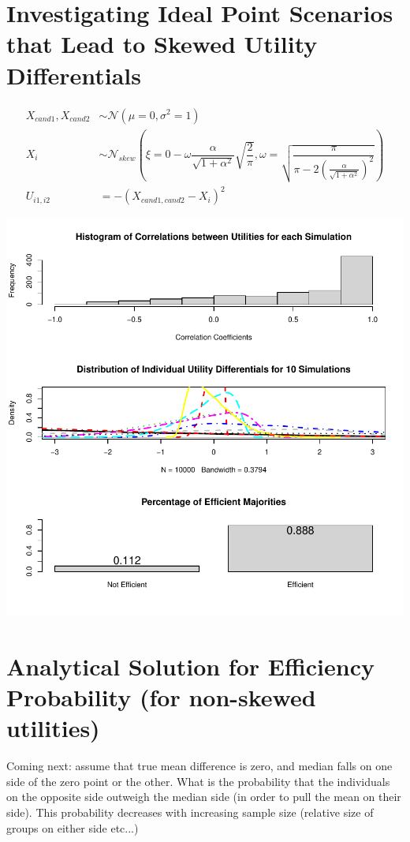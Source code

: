 \documentclass[12pt]{scrartcl}\usepackage[]{graphicx}\usepackage[]{color}
\makeatletter
\def\maxwidth{ %
  \ifdim\Gin@nat@width>\linewidth
    \linewidth
  \else
    \Gin@nat@width
  \fi
}
\newenvironment{knitrout}{}{} %
\makeatother
\begin{document}
\clearpage
\section{Investigating Ideal Point Scenarios that Lead to Skewed Utility Differentials}
\begin{align*}
X_{cand1},X_{cand2} &\sim \mathcal{N}(\mu=0,\sigma^2=1) \\
X_i &\sim \mathcal{N}_{skew}\left(\xi=0- \omega\dfrac{\alpha}{\sqrt{1+\alpha^2}}\sqrt{\dfrac{2}{\pi}},
\omega=\sqrt{\dfrac{\pi}{\pi-2\left(\tfrac{\alpha}{\sqrt{1+\alpha^2}}\right)^2}}\right) \\
U_{i1,i2} &= -(X_{cand1,cand2}-X_i)^2
\end{align*}

\begin{knitrout}
\color{fgcolor}
\includegraphics[width=\maxwidth]{figure/unnamed-chunk-12} 

\end{knitrout}


\section{Analytical Solution for Efficiency Probability (for non-skewed utilities)}

Coming next: assume that true mean difference is zero, and median falls on one side of the zero point or the other. What is the probability that the individuals on the opposite side outweigh the median side (in order to pull the mean on their side). This probability decreases with increasing sample size (relative size of groups on either side etc...)
\end{document}
